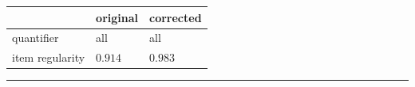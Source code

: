 \vspace{-0.25em}

\begin{table}[!ht]

\begin{center}

\begin{tabularx}{\columnwidth}{|X|X|X|}
      \hline
                        & original      & corrected \\
      \hline
      quantifier        & all      & all   \\
      \hline
      item regularity   & $0.914$      & $0.983$   \\
      \hline
\end{tabularx}
\end{center}
\end{table}

\vspace{-0.75em}
\hrule
